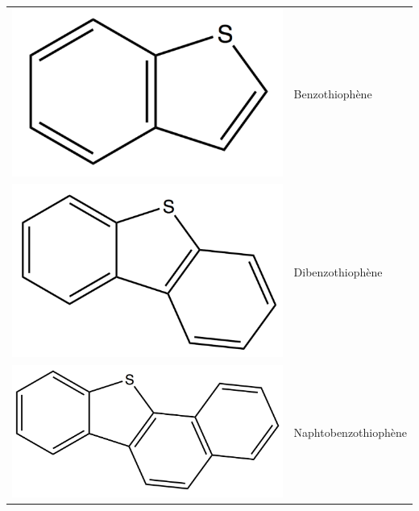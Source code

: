 \begin{table}[h!]
\begin{center}
\begin{tabular}{rl}
			\includegraphics[scale=0.08]{image/benzothiophene} & Benzothiophène \\
			\includegraphics[scale=0.08]{image/dibenzothiophene} & Dibenzothiophène \\
			\includegraphics[scale=0.08]{image/naphto1} & Naphtobenzothiophène \\

\end{tabular}
\end{center}
\end{table}
